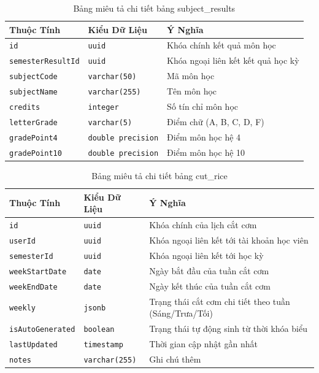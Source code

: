 \documentclass[../DoAn.tex]{subfiles}
\begin{document}
\begin{table}[H]
\centering
\small
\renewcommand{\arraystretch}{1.2}
\begin{tabular}{|l|p{4.5cm}|p{7.5cm}|}
\hline
\textbf{Thuộc Tính} & \textbf{Kiểu Dữ Liệu} & \textbf{Ý Nghĩa} \\ \hline
\texttt{id} & \texttt{uuid} & Khóa chính kết quả môn học \\ \hline
\texttt{semesterResultId} & \texttt{uuid} & Khóa ngoại liên kết kết quả học kỳ \\ \hline
\texttt{subjectCode} & \texttt{varchar(50)} & Mã môn học \\ \hline
\texttt{subjectName} & \texttt{varchar(255)} & Tên môn học \\ \hline
\texttt{credits} & \texttt{integer} & Số tín chỉ môn học \\ \hline
\texttt{letterGrade} & \texttt{varchar(5)} & Điểm chữ (A, B, C, D, F) \\ \hline
\texttt{gradePoint4} & \texttt{double precision} & Điểm môn học hệ 4 \\ \hline
\texttt{gradePoint10} & \texttt{double precision} & Điểm môn học hệ 10 \\ \hline
\end{tabular}
\caption{Bảng miêu tả chi tiết bảng subject\_results}
\label{tab:subject_result_details}
\end{table}

\begin{table}[H]
\centering
\small
\renewcommand{\arraystretch}{1.2}
\begin{tabular}{|l|p{4.5cm}|p{7.5cm}|}
\hline
\textbf{Thuộc Tính} & \textbf{Kiểu Dữ Liệu} & \textbf{Ý Nghĩa} \\ \hline
\texttt{id} & \texttt{uuid} & Khóa chính của lịch cắt cơm \\ \hline
\texttt{userId} & \texttt{uuid} & Khóa ngoại liên kết tới tài khoản học viên \\ \hline
\texttt{semesterId} & \texttt{uuid} & Khóa ngoại liên kết tới học kỳ \\ \hline
\texttt{weekStartDate} & \texttt{date} & Ngày bắt đầu của tuần cắt cơm \\ \hline
\texttt{weekEndDate} & \texttt{date} & Ngày kết thúc của tuần cắt cơm \\ \hline
\texttt{weekly} & \texttt{jsonb} & Trạng thái cắt cơm chi tiết theo tuần (Sáng/Trưa/Tối) \\ \hline
\texttt{isAutoGenerated} & \texttt{boolean} & Trạng thái tự động sinh từ thời khóa biểu \\ \hline
\texttt{lastUpdated} & \texttt{timestamp} & Thời gian cập nhật gần nhất \\ \hline
\texttt{notes} & \texttt{varchar(255)} & Ghi chú thêm \\ \hline
\end{tabular}
\caption{Bảng miêu tả chi tiết bảng cut\_rice}
\label{tab:cut_rice_details}
\end{table}
\end{document}

